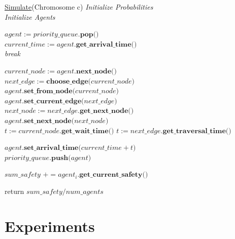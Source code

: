 \documentclass{sig-alternate-05-2015}
\begin{document}
\vspace*{0in}
\begin{algorithm}[tb]
\label{alg:eval}

\underline{Simulate}(Chromosome c)\;
\emph{Initialize Probabilities}\\
\emph{Initialize Agents}

{
$agent := priority\_queue.\textbf{pop()}$\\
$current\_time := agent.\textbf{get\_arrival\_time()}$\\

{
\emph{break}
}

$current\_node := agent.\textbf{next\_node()}$\\
$next\_edge := \textbf{choose\_edge(} current\_node \textbf{)}$\\

$agent.\textbf{set\_from\_node(} current\_node \textbf{)}$\\
$agent.\textbf{set\_current\_edge(} next\_edge \textbf{)}$\\
$next\_node := next\_edge.\textbf{get\_next\_node()}$\\
$agent.\textbf{set\_next\_node(} next\_node)$\\

{
$t := current\_node.\textbf{get\_wait\_time()}$
}
{
$t := next\_edge.\textbf{get\_traversal\_time()}$
}

$agent.\textbf{set\_arrival\_time(} current\_time + t \textbf{)}$\\
$priority\_queue.\textbf{push(} agent\textbf{)}$
}

{
$sum\_safety$ $+= agent_i.\textbf{get\_current\_safety()}$
}

return $sum\_safety / num\_agents$

\caption{Simulation of agent movement through a defined city topology,
  based on probabilities provided in Chromosome object}
\end{algorithm}


\section{Experiments}
\end{document}
